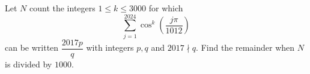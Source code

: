 Let $N$ count the integers $1\le k\le3000$ for which
\[
\sum_{j=1}^{2024}\cos^k\left(\dfrac{j\pi}{1012}\right)
\]
can be written $\dfrac{2017p}{q}$ with integers $p,q$ and $2017\nmid q$. Find the remainder when $N$ is divided by $1000$.
